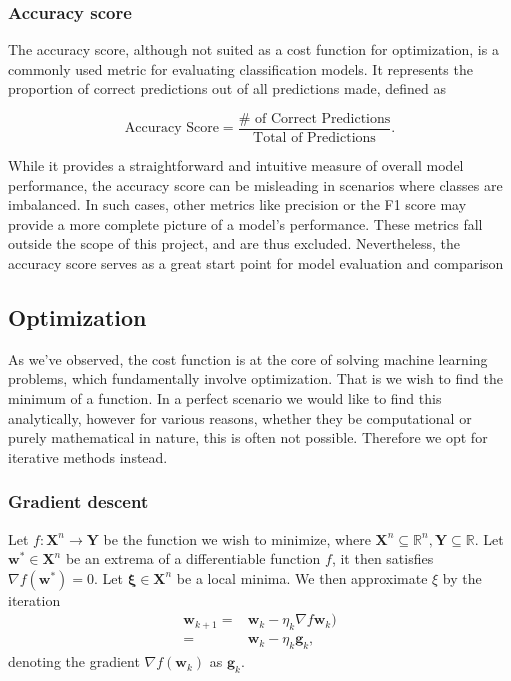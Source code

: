 \documentclass{article}
\theoremstyle{definition}
\begin{document}



\subsubsection{Accuracy score}

The accuracy score, although not suited as a cost function for optimization, is a commonly used metric for evaluating classification models. It represents the proportion of correct predictions out of all predictions made, defined as

\begin{equation*}
    \text{Accuracy Score} = \frac{ \# \text{ of Correct Predictions}}{\text{Total} \text{ of Predictions}}.
\end{equation*}

While it provides a straightforward and intuitive measure of overall model performance, the accuracy score can be misleading in scenarios where classes are imbalanced. In such cases, other metrics like precision or the F1 score may provide a more complete picture of a model's performance. These metrics fall outside the scope of this project, and are thus excluded. Nevertheless, the accuracy score serves as a great start point for model evaluation and comparison

\subsection{Optimization}
As we've observed, the cost function is at the core of solving machine learning problems, which fundamentally involve optimization. That is we wish to find the minimum of a function. In a perfect scenario we would like to find this analytically, however for various reasons, whether they be computational or purely mathematical in nature, this is often not possible. Therefore we opt for iterative methods instead.

\subsubsection{Gradient descent}
Let  $f: \mathbf{X}^n \rightarrow \mathbf{Y}$ be the function we wish to minimize, where $ \mathbf{X}^n \subseteq \mathbb{R}^n, \mathbf{Y}\subseteq \mathbb{R}$. Let $\boldsymbol{w}^* \in \mathbf{X}^n$ be an extrema of a differentiable function $f$, it then satisfies $\nabla f(\boldsymbol{w}^*) = 0$. Let $\boldsymbol{\xi} \in \mathbf{X}^n$ be a local minima. We then approximate $\xi$ by the iteration
\begin{equation}
\begin{aligned} 
    \boldsymbol{w}_{k+1} =& \boldsymbol{w}_k - \eta_k \nabla  f \boldsymbol{w}_k) \\
    =& \boldsymbol{w}_k - \eta_k  \boldsymbol{g}_k,
\end{aligned}
\label{eq:gradient_descent}
\end{equation}
denoting the gradient $\nabla f(\boldsymbol{w}_k)$ as $\boldsymbol{g}_k$.
\end{document}
